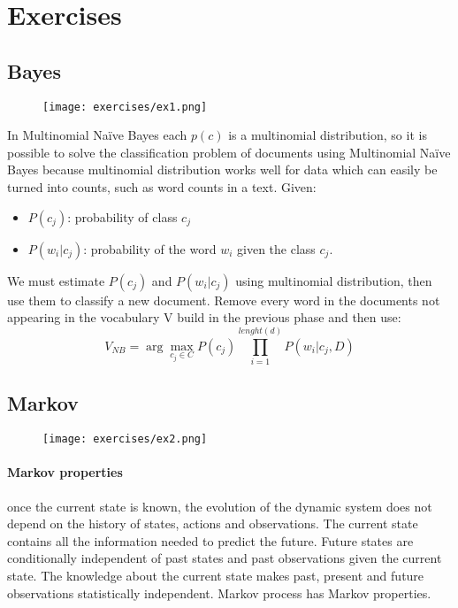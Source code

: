 
\newcommand{\argmaxs}[2]{\arg \max_{#2}{#1}}

\section{Exercises}

\subsection{Bayes}
\begin{figure}[H]
    \centering
    \texttt{[image: exercises/ex1.png]}
\end{figure}


In Multinomial Naïve Bayes each $p(c)$ is a multinomial distribution, so it is possible to solve the classification problem of documents using Multinomial Naïve Bayes because multinomial distribution works well for data which can easily be turned into counts, such as word counts in a text.
Given:
\begin{itemize}
\item $P(c_j)$: probability of class $c_j$
\item $P(w_i|c_j)$: probability of the word $w_i$ given the class $c_j$.
\end{itemize}
We must estimate $P(c_j)$ and $P(w_i|c_j)$ using multinomial distribution, then use them to classify a new document. Remove every word in the documents not appearing in the vocabulary V build in the previous phase and then use:
\[V_{NB}=\argmaxs{P(c_j)\prod_{i=1}^{lenght(d)}P(w_i|c_j,D)}{c_j \in C}\]

\subsection{Markov}
\begin{figure}[H]
    \centering
    \texttt{[image: exercises/ex2.png]}
\end{figure}

\paragraph{Markov properties} once the current state is known, the evolution of the dynamic system does not depend on the history of states, actions and observations. The current state contains all the information needed to predict the future. Future states are conditionally independent of past states and past observations given the current state. The knowledge about the current state makes past, present and future observations statistically independent. Markov process has Markov properties.\\


